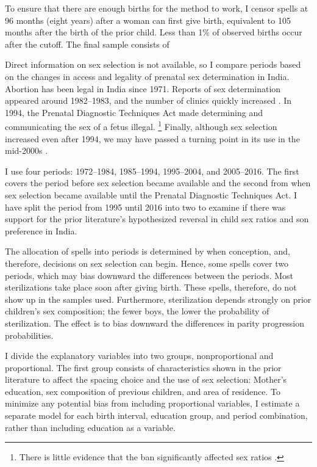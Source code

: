 \documentclass[12pt,letterpaper]{article}
\begin{document}
To ensure that there are enough births for the method to work, I censor spells at 96 
months (eight years) after a woman can first give birth, equivalent to 105 months 
after the birth of the prior child.
Less than 1\% of observed births occur after the cutoff.
The final sample consists of 


% 

Direct information on sex selection is not available, so I compare periods 
based on the changes in access and legality of prenatal sex determination in India.
Abortion has been legal in India since 1971.
Reports of sex determination appeared around 1982--1983, and the number of clinics 
quickly increased \citep{Sudha1999,bhat06,Grover2006}.
In 1994, the Prenatal Diagnostic Techniques Act made determining and communicating 
the sex of a fetus illegal.%
\footnote{
There is little evidence that the ban significantly affected sex ratios \citep{Das-Gupta2019}.
}
Finally, although sex selection increased even after 1994, we may have passed a 
turning point in its use in the mid-2000s \citep{Das_Gupta2009,Kumar2012,Bongaarts2013,Diamond-Smith2015}.

I use four periods: 1972--1984, 1985--1994, 1995--2004, and 2005--2016.
The first covers the period before sex selection became available and the second from when sex 
selection became available until the Prenatal Diagnostic Techniques Act.
I have split the period from 1995 until 2016 into two to examine if there was support for 
the prior literature's hypothesized reversal in child sex ratios and son 
preference in India.

The allocation of spells into periods is determined by when conception, and, therefore, 
decisions on sex selection can begin. 
Hence, some spells cover two periods, which may bias downward the differences between the 
periods.
Most sterilizations take place soon after giving birth. 
These spells, therefore, do not show up in the samples used. 
Furthermore, sterilization depends strongly on prior children's sex composition; the 
fewer boys, the lower the probability of sterilization. 
The effect is to bias downward the differences in parity progression probabilities.

I divide the explanatory variables into two groups, nonproportional and proportional. 
The first group consists of characteristics shown in the prior literature to affect the 
spacing choice and the use of sex selection: Mother’s education, sex composition of 
previous children, and area of residence.
To minimize any potential bias from including proportional variables, I estimate a 
separate model for each birth interval, education group, and period combination, rather 
than including education as a variable. 
\end{document}
